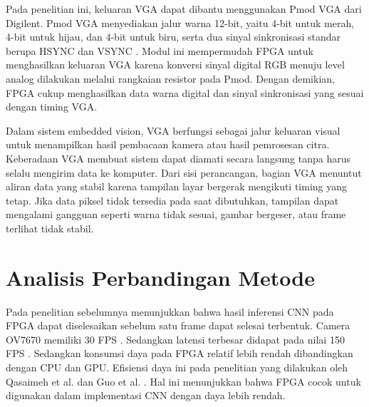   Pada penelitian ini, keluaran VGA dapat dibantu menggunakan Pmod VGA dari
  Digilent. Pmod VGA menyediakan jalur warna 12-bit, yaitu 4-bit untuk merah,
  4-bit untuk hijau, dan 4-bit untuk biru, serta dua sinyal sinkronisasi standar
  berupa HSYNC dan VSYNC \cite{DigilentVGADisplay}. Modul ini
  mempermudah FPGA untuk menghasilkan keluaran VGA karena konversi sinyal digital
  RGB menuju level analog dilakukan melalui rangkaian resistor pada Pmod. Dengan
  demikian, FPGA cukup menghasilkan data warna digital dan sinyal sinkronisasi
  yang sesuai dengan timing VGA.

  Dalam sistem embedded vision, VGA berfungsi sebagai jalur keluaran visual untuk
  menampilkan hasil pembacaan kamera atau hasil pemrosesan citra. Keberadaan VGA
  membuat sistem dapat diamati secara langsung tanpa harus selalu mengirim data ke
  komputer. Dari sisi perancangan, bagian VGA menuntut aliran data yang stabil
  karena tampilan layar bergerak mengikuti timing yang tetap. Jika data piksel tidak
  tersedia pada saat dibutuhkan, tampilan dapat mengalami gangguan seperti warna
  tidak sesuai, gambar bergeser, atau frame terlihat tidak stabil.

\section{Analisis Perbandingan Metode}

Pada penelitian sebelumnya menunjukkan bahwa hasil inferensi CNN pada FPGA dapat
diselesaikan sebelum satu frame dapat selesai terbentuk. Camera OV7670 memiliki
30 FPS \cite{OmniVision2006OV7670}. Sedangkan latensi terbesar didapat pada nilai 150 FPS \cite{Solovyev2019FixedPointCNN}.
Sedangkan konsumsi daya pada FPGA relatif lebih rendah dibandingkan dengan CPU dan GPU.
Efisiensi daya ini pada penelitian yang dilakukan oleh Qasaimeh et al. dan Guo et al. \cite{Qasaimeh2019ComparingEE, Guo2019FPGANNInferenceSurvey}.
Hal ini menunjukkan bahwa FPGA cocok untuk digunakan dalam implementasi CNN dengan daya lebih rendah.

